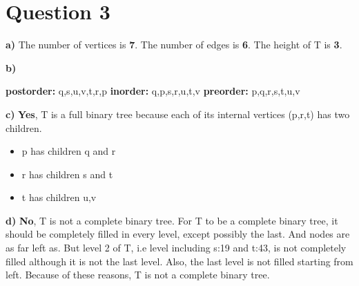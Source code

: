 \documentclass[11pt]{article}
\begin{document}
\newpage

\section*{Question 3}

\textbf{a)}\newline \newline
The number of vertices is \textbf{7}. \newline
The number of edges is \textbf{6}. \newline
The height of T is \textbf{3}. \newline \newline

\noindent \textbf{b)} \newline

\noindent \textbf{postorder: } q,s,u,v,t,r,p \newline \newline
\textbf{inorder: } q,p,s,r,u,t,v \newline \newline
\textbf{preorder:} p,q,r,s,t,u,v  \newline \newline

\noindent \textbf{c)} \newline \newline
\textbf{Yes}, T is a full binary tree because each of its internal vertices (p,r,t) has two children. \newline \newline
\begin{itemize}
    \item p has children q and r
    \item r has children s and t
    \item t has children u,v \newline \newline
\end{itemize}



\noindent \textbf{d)} \newline \newline
\textbf{No}, T is not a complete binary tree.  \newline \newline
For T to be a complete binary tree, it should be completely filled in every level, except possibly the last. And nodes are as far left as. But level 2 of T, i.e level including s:19 and t:43, is not completely filled although it is not the last level. Also, the last level is not filled starting from left. Because of these reasons, T is not a complete binary tree. 
\end{document}
